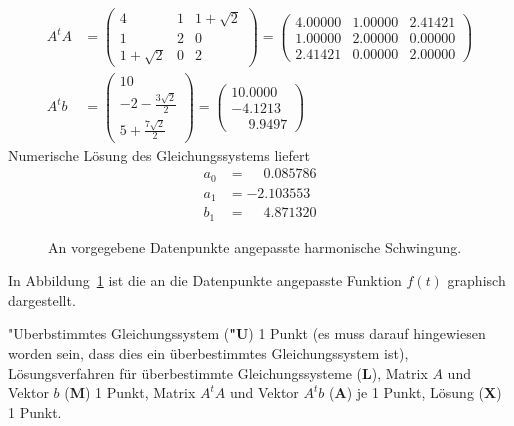 \begin{loesung}
\begin{align*}
A^tA&=
\begin{pmatrix}
         4&1&1+\sqrt{2}\\
         1&2&         0\\
1+\sqrt{2}&0&         2
\end{pmatrix}
=\begin{pmatrix}
   4.00000 & 1.00000 & 2.41421 \\
   1.00000 & 2.00000 & 0.00000 \\
   2.41421 & 0.00000 & 2.00000
\end{pmatrix}
\\
A^tb&=
\begin{pmatrix}
10\\
-2-\frac{3\sqrt{2}}2\\
5+\frac{7\sqrt{2}}2
\end{pmatrix}
=\begin{pmatrix}
10.0000\\
-4.1213\\
\phantom{-}9.9497
\end{pmatrix}
\end{align*}
Numerische Lösung des Gleichungssystems liefert 
\begin{align*}
a_0&=\phantom{-}0.085786\\
a_1&=-2.103553\\
b_1&=\phantom{-}4.871320
\end{align*}
\begin{figure}
\centering
{}
\caption{An vorgegebene Datenpunkte angepasste harmonische Schwingung.
\label{40000034:1}
}
\end{figure}
In Abbildung~\ref{40000034:1} ist die an die Datenpunkte angepasste
Funktion $f(t)$ graphisch dargestellt.
\end{loesung}

\begin{bewertung}
"Uberbstimmtes Gleichungssystem ({\bf "U}) 1 Punkt (es muss darauf hingewiesen
worden sein, dass dies ein überbestimmtes Gleichungssystem ist),
Lösungsverfahren für überbestimmte Gleichungssysteme ({\bf L}),
Matrix $A$ und Vektor $b$ ({\bf M}) 1 Punkt,
Matrix $A^tA$ und Vektor $A^tb$ ({\bf A}) je 1 Punkt,
Lösung ({\bf X}) 1 Punkt.
\end{bewertung}

